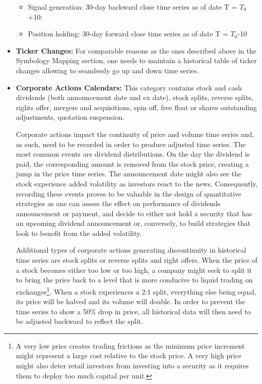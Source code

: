 \begin{itemize}
\begin{itemize}
\hspace*{-0.5cm}{\tt select close from data where date in [T-30,  T], sym=ABC}

\item Signal generation: 30-day backward close time series as of date T = $T_0$+10:

\hspace*{-0.5cm}{\tt select close from data where date in [$T_0$-20,  $T_0$+10], sym=EDF}

\item Position holding: 30-day forward close time series as of date T = $T_0$-10

\hspace*{-0.5cm}{\tt select close from data where date in [$T_0$-10,  $T_0$+20], sym=ABC}

\end{itemize}

\item \textbf{Ticker Changes:} For comparable reasons as the ones described above in the Symbology Mapping section, one needs to maintain a historical table of ticker changes allowing to seamlessly go up and down time series. 


\item \textbf{Corporate Actions Calendars:} This category contains stock and cash dividends (both announcement date and ex date), stock splits, reverse splits, rights offer, mergers and acquisitions, spin off, free float or shares outstanding adjustments, quotation suspension.


Corporate actions impact the continuity of price and volume time series and, as such, need to be recorded in order to produce adjusted time series. The most common events are dividend distributions. On the day the dividend is paid, the corresponding amount is removed from the stock price, creating a jump in the price time series. The announcement date might also see the stock experience added volatility as investors react to the news. Consequently, recording these events proves to be valuable in the design of quantitative strategies as one can assess the effect on performance of dividends announcement or payment, and decide to either not hold a security that has an upcoming dividend announcement or, conversely, to build strategies that look to benefit from the added volatility. 


Additional types of corporate actions generating discontinuity in historical time series are stock splits or reverse splits and right offers. When the price of a stock becomes either too low or too high, a company might seek to split it to bring the price back to a level that is more conducive to liquid trading on exchanges\footnote{A very low price creates trading frictions as the minimum price increment might represent a large cost relative to the stock price. A very high price might also deter retail investors from investing into a security as it requires them to deploy too much capital per unit.}. When a stock experiences a 2:1 split, everything else being equal, its price will be halved and its volume will double. In order to prevent the time series to show a 50\% drop in price, all historical data will then need to be adjusted backward to reflect the split.



\end{itemize}
